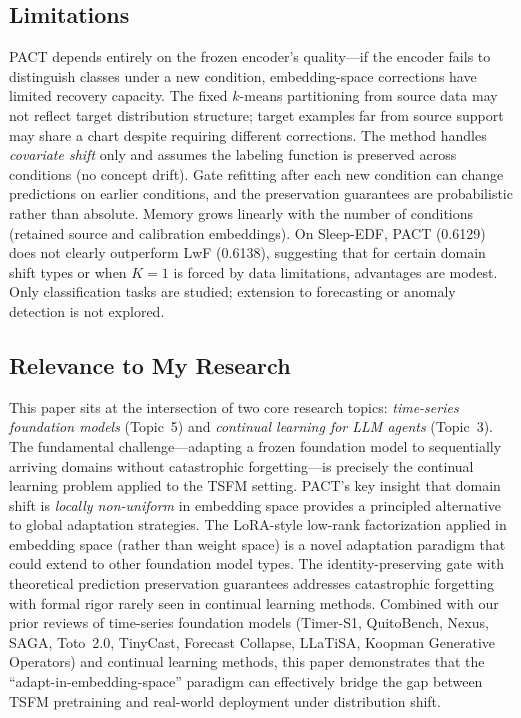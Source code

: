 \documentclass[11pt,a4paper]{article}
\begin{document}
\subsection{Limitations}
PACT depends entirely on the frozen encoder's quality---if the encoder fails to distinguish classes under a new condition, embedding-space corrections have limited recovery capacity. The fixed $k$-means partitioning from source data may not reflect target distribution structure; target examples far from source support may share a chart despite requiring different corrections. The method handles \emph{covariate shift} only and assumes the labeling function is preserved across conditions (no concept drift). Gate refitting after each new condition can change predictions on earlier conditions, and the preservation guarantees are probabilistic rather than absolute. Memory grows linearly with the number of conditions (retained source and calibration embeddings). On Sleep-EDF, PACT (0.6129) does not clearly outperform LwF (0.6138), suggesting that for certain domain shift types or when $K{=}1$ is forced by data limitations, advantages are modest. Only classification tasks are studied; extension to forecasting or anomaly detection is not explored.

\subsection{Relevance to My Research}
This paper sits at the intersection of two core research topics: \emph{time-series foundation models} (Topic~5) and \emph{continual learning for LLM agents} (Topic~3). The fundamental challenge---adapting a frozen foundation model to sequentially arriving domains without catastrophic forgetting---is precisely the continual learning problem applied to the TSFM setting. PACT's key insight that domain shift is \emph{locally non-uniform} in embedding space provides a principled alternative to global adaptation strategies. The LoRA-style low-rank factorization applied in embedding space (rather than weight space) is a novel adaptation paradigm that could extend to other foundation model types. The identity-preserving gate with theoretical prediction preservation guarantees addresses catastrophic forgetting with formal rigor rarely seen in continual learning methods. Combined with our prior reviews of time-series foundation models (Timer-S1, QuitoBench, Nexus, SAGA, Toto~2.0, TinyCast, Forecast Collapse, LLaTiSA, Koopman Generative Operators) and continual learning methods, this paper demonstrates that the ``adapt-in-embedding-space'' paradigm can effectively bridge the gap between TSFM pretraining and real-world deployment under distribution shift.
\end{document}
